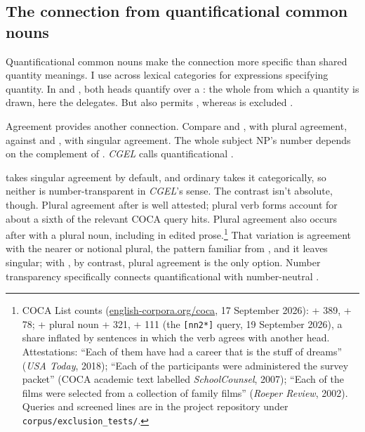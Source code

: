 \documentclass[12pt]{article}
\begin{document}
\subsection{The connection from quantificational common nouns}\label{sec:quant-nouns}

Quantificational common nouns make the connection more specific than shared quantity meanings. I use  across lexical categories for expressions specifying quantity. In  and , both heads quantify over a : the whole from which a quantity is drawn, here the delegates. But  also permits , whereas  is excluded \citep[349]{huddleston2002}.

Agreement provides another connection. Compare  and , with plural agreement, against  and , with singular agreement. The whole subject NP's number depends on the complement of . \textit{CGEL} calls quantificational   \citep[349--350, 501--503]{huddleston2002}.

 takes singular agreement by default, and ordinary  takes it categorically, so neither is number-transparent in \textit{CGEL}'s sense. The contrast isn't absolute, though. Plural agreement after  is well attested; plural verb forms account for about a sixth of the relevant COCA query hits. Plural agreement also occurs after  with a plural noun, including in edited prose.\footnote{COCA List counts (\href{https://www.english-corpora.org/coca/}{english-corpora.org/coca}, 17 September 2026):  +  389, +  78;  + plural noun +  321, +  111 (the \texttt{[nn2*]} query, 19 September 2026), a share inflated by sentences in which the verb agrees with another head. Attestations: \enquote{Each of them have had a career that is the stuff of dreams} (\textit{USA Today}, 2018); \enquote{Each of the participants were administered the survey packet} (COCA academic text labelled \textit{SchoolCounsel}, 2007); \enquote{Each of the films were selected from a collection of family films} (\textit{Roeper Review}, 2002). Queries and screened lines are in the project repository under \texttt{corpus/exclusion\_tests/}.} That variation is agreement with the nearer or notional plural, the pattern familiar from , and it leaves  singular; with , by contrast, plural agreement is the only option. Number transparency specifically connects quantificational  with number-neutral .
\end{document}
